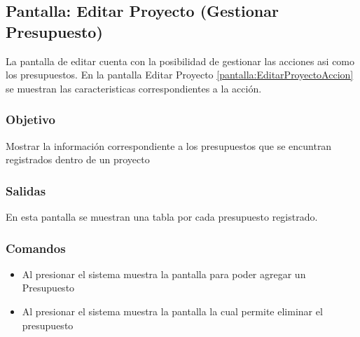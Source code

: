 \subsection{Pantalla: Editar Proyecto (Gestionar Presupuesto)}\label{pantalla:EditarProyectoPresupuesto}
La pantalla de editar cuenta con la posibilidad de gestionar las acciones asi como los presupuestos. En la pantalla Editar Proyecto \ref{pantalla:EditarProyectoAccion} se muestran las caracteristicas correspondientes a la acción.

\subsubsection{Objetivo}
  Mostrar la información correspondiente a los presupuestos que se encuntran registrados dentro de un proyecto


\subsubsection{Salidas}
  En esta pantalla se muestran una tabla por cada presupuesto registrado.

\subsubsection{Comandos}
\begin{itemize}
 \item Al presionar  el sistema muestra la pantalla  para poder agregar un Presupuesto
 \item Al presionar  el sistema muestra la pantalla  la cual permite eliminar el presupuesto
\end{itemize}

